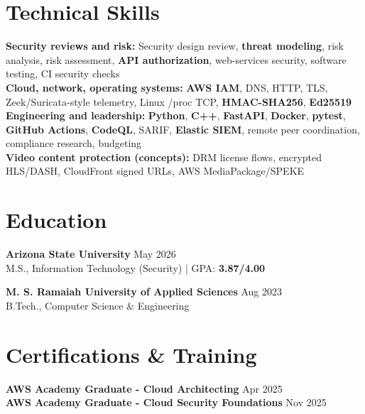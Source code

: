 \documentclass[letterpaper,10pt]{article}
\begin{document}
\section{Technical Skills}
{\fontsize{11.3}{13.8}\selectfont
\textbf{Security reviews and risk:} Security design review, \textbf{threat modeling}, risk analysis, risk assessment, \textbf{API authorization}, web-services security, software testing, CI security checks\\[3pt]
\textbf{Cloud, network, operating systems:} \textbf{AWS IAM}, DNS, HTTP, TLS, Zeek/Suricata-style telemetry, Linux /proc TCP, \textbf{HMAC-SHA256}, \textbf{Ed25519}\\[3pt]
\textbf{Engineering and leadership:} \textbf{Python}, \textbf{C++}, \textbf{FastAPI}, \textbf{Docker}, \textbf{pytest}, \textbf{GitHub Actions}, \textbf{CodeQL}, SARIF, \textbf{Elastic SIEM}, remote peer coordination, compliance research, budgeting\\[3pt]
\textbf{Video content protection (concepts):} DRM license flows, encrypted HLS/DASH, CloudFront signed URLs, AWS MediaPackage/SPEKE}

\section{Education}
\textbf{Arizona State University} \hfill May 2026\\
M.S., Information Technology (Security) | GPA: \textbf{3.87/4.00}\vspace{4pt}

\textbf{M. S. Ramaiah University of Applied Sciences} \hfill Aug 2023\\
B.Tech., Computer Science \& Engineering

\section{Certifications \& Training}
\textbf{AWS Academy Graduate - Cloud Architecting} \hfill Apr 2025\\[3pt]
\textbf{AWS Academy Graduate - Cloud Security Foundations} \hfill Nov 2025
\end{document}
